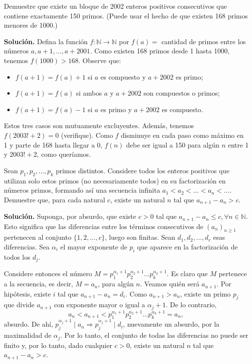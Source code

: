 \documentclass[11pt]{scrartcl}
\begin{document}
\begin{example}
Demuestre que existe un bloque de 2002 enteros positivos consecutivos que contiene exactamente 150 primos. (Puede usar el hecho de que existen 168 primos menores de 1000.)
\end{example}
\textbf{Solución.} Defina la función $f : \mathbb{N} \rightarrow \mathbb{N}$ por $f(a) = $ cantidad de primos entre los números $a, a + 1, \dots, a + 2001$. Como existen 168 primos desde 1 hasta 1000, tenemos $f(1000) > 168$. Observe que:
\begin{itemize}
    \item $f(a + 1) = f(a) + 1$ si $a$ es compuesto y $a + 2002$ es primo;
    \item $f(a + 1) = f(a)$ si ambos $a$ y $a + 2002$ son compuestos o primos;
    \item $f(a + 1) = f(a) - 1$ si $a$ es primo y $a + 2002$ es compuesto.
\end{itemize}
Estos tres casos son mutuamente excluyentes. Además, tenemos $f(2003! + 2) = 0$ (verifique). Como $f$ disminuye en cada paso como máximo en 1 y parte de 168 hasta llegar a 0, $f(n)$ debe ser igual a 150 para algún $n$ entre 1 y $2003! + 2$, como queríamos.

\begin{example}[Rioplatense 1999]
Sean $p_1, p_2, \dots, p_k$ primos distintos. Considere todos los enteros positivos que utilizan solo estos primos (no necesariamente todos) en su factorización en números primos, formando así una secuencia infinita $a_1 < a_2 < \dots < a_n < \dots$. Demuestre que, para cada natural $c$, existe un natural $n$ tal que $a_{n+1} - a_n > c$.
\end{example}
\textbf{Solución.} Suponga, por absurdo, que existe $c > 0$ tal que $a_{n+1} - a_n \leq c, \forall n \in \mathbb{N}$. Esto significa que las diferencias entre los términos consecutivos de $(a_n)_{n \geq 1}$ pertenecen al conjunto $\{1, 2, \dots, c\}$, luego son finitas. Sean $d_1, d_2, \dots, d_r$ esas diferencias. Sea $\alpha_i$ el mayor exponente de $p_i$ que aparece en la factorización de todos los $d_j$.

Considere entonces el número $M = p_1^{\alpha_1 + 1} p_2^{\alpha_2 + 1} \dots p_k^{\alpha_k + 1}$. Es claro que $M$ pertenece a la secuencia, es decir, $M = a_n$, para algún $n$. Veamos quién será $a_{n+1}$. Por hipótesis, existe $i$ tal que $a_{n+1} - a_n = d_i$. Como $a_{n+1} > a_n$, existe un primo $p_j$ que divide $a_{n+1}$ con exponente mayor o igual a $\alpha_j + 1$. De lo contrario,
\[
a_n < a_{n+1} < p_1^{\alpha_1 + 1} p_2^{\alpha_2 + 1} \dots p_k^{\alpha_k + 1} = a_n,
\]
absurdo. De ahí, $p_j^{\alpha_j + 1} \mid a_n \Rightarrow p_j^{\alpha_j + 1} \mid d_i$, nuevamente un absurdo, por la maximalidad de $\alpha_j$. Por lo tanto, el conjunto de todas las diferencias no puede ser finito y, por lo tanto, dado cualquier $c > 0$, existe un natural $n$ tal que $a_{n+1} - a_n > c$.
\end{document}
